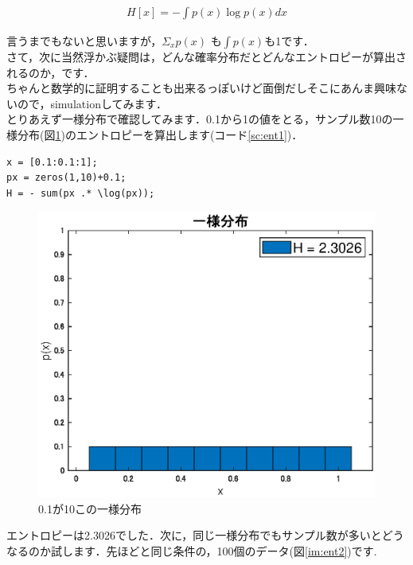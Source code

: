\documentclass[11pt,a4paper,dvipdfmx]{ujreport}
\begin{document}
\begin{eqnarray}
\label{eq:entropy2}
H[x] = - \int p(x) \log p(x) dx
\end{eqnarray}

言うまでもないと思いますが，$ \Sigma_{x} p(x)$ も$ \int p(x)$も1です．\\

さて，次に当然浮かぶ疑問は，どんな確率分布だとどんなエントロピーが算出されるのか，です．\\

ちゃんと数学的に証明することも出来るっぽいけど面倒だしそこにあんま興味ないので，simulationしてみます．\\

とりあえず一様分布で確認してみます．0.1から1の値をとる，サンプル数10の一様分布(図\ref{im:ent1})のエントロピーを算出します(コード\ref{sc:ent1})．
\begin{lstlisting}[caption=エントロピーの計算,label=sc:ent1]
x = [0.1:0.1:1];
px = zeros(1,10)+0.1;
H = - sum(px .* \log(px));

\end{lstlisting}

\begin{figure}[H]
\label{im:ent1}
  \centering
  \includegraphics[width=15cm]{../figures/ent_uni.eps}
  \caption{0.1が10この一様分布}
\end{figure}

エントロピーは2.3026でした．次に，同じ一様分布でもサンプル数が多いとどうなるのか試します．先ほどと同じ条件の，100個のデータ(図\ref{im:ent2})です.
\end{document}
